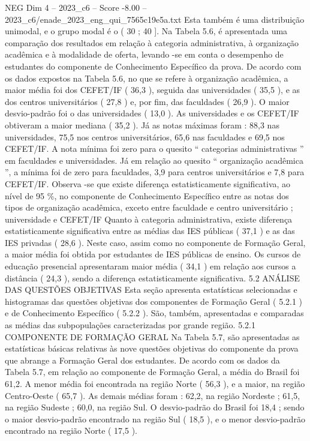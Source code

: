 \begin{textsample}{NEG Dim 4 – 2023\_c6 – Score -8.00 – 2023\_c6/enade\_2023\_eng\_qui\_7565c19e5a.txt}
Esta também é uma distribuição unimodal, e o grupo modal é o ( 30 ; 40 ].
Na Tabela 5.6, é apresentada uma comparação dos resultados em relação à categoria administrativa, à organização acadêmica e à modalidade de oferta, levando -se em conta o desempenho de estudantes do componente de Conhecimento Específico da prova.
De acordo com os dados expostos na Tabela 5.6, no que se refere à organização acadêmica, a maior média foi dos CEFET/IF ( 36,3 ), seguida das universidades ( 35,5 ), e as dos centros universitários ( 27,8 ) e, por fim, das faculdades ( 26,9 ).
O maior desvio-padrão foi o das universidades ( 13,0 ).
As universidades e os CEFET/IF obtiveram a maior mediana ( 35,2 ).
Já as notas máximas foram : 88,3 nas universidades, 75,5 nos centros universitários, 65,6 nas faculdades e 69,5 nos CEFET/IF.
A nota mínima foi zero para o quesito “ categorias administrativas ” em faculdades e universidades.
Já em relação ao quesito “ organização acadêmica ”, a mínima foi de zero para faculdades, 3,9 para centros universitários e 7,8 para CEFET/IF.
Observa -se que existe diferença estatisticamente significativa, ao nível de 95 \%, no componente de Conhecimento Específico entre as notas dos tipos de organização acadêmica, exceto entre faculdade e centro universitário ; universidade e CEFET/IF Quanto à categoria administrativa, existe diferença estatisticamente significativa entre as médias das IES públicas ( 37,1 ) e as das IES privadas ( 28,6 ).
Neste caso, assim como no componente de Formação Geral, a maior média foi obtida por estudantes de IES públicas de ensino.
Os cursos de educação presencial apresentaram maior média ( 34,1 ) em relação aos cursos a distância ( 24,3 ), sendo a diferença estatisticamente significativa. 5.2 ANÁLISE DAS QUESTÕES OBJETIVAS Esta seção apresenta estatísticas selecionadas e histogramas das questões objetivas dos componentes de Formação Geral ( 5.2.1 ) e de Conhecimento Específico ( 5.2.2 ).
São, também, apresentadas e comparadas as médias das subpopulações caracterizadas por grande região. 5.2.1 COMPONENTE DE FORMAÇÃO GERAL Na Tabela 5.7, são apresentadas as estatísticas básicas relativas às nove questões objetivas do componente da prova que abrange a Formação Geral dos estudantes.
De acordo com os dados da Tabela 5.7, em relação ao componente de Formação Geral, a média do Brasil foi 61,2.
A menor média foi encontrada na região Norte ( 56,3 ), e a maior, na região Centro-Oeste ( 65,7 ).
As demais médias foram : 62,2, na região Nordeste ; 61,5, na região Sudeste ; 60,0, na região Sul.
O desvio-padrão do Brasil foi 18,4 ; sendo o maior desvio-padrão encontrado na região Sul ( 18,5 ), e o menor desvio-padrão encontrado na região Norte ( 17,5 ).

\end{textsample}
